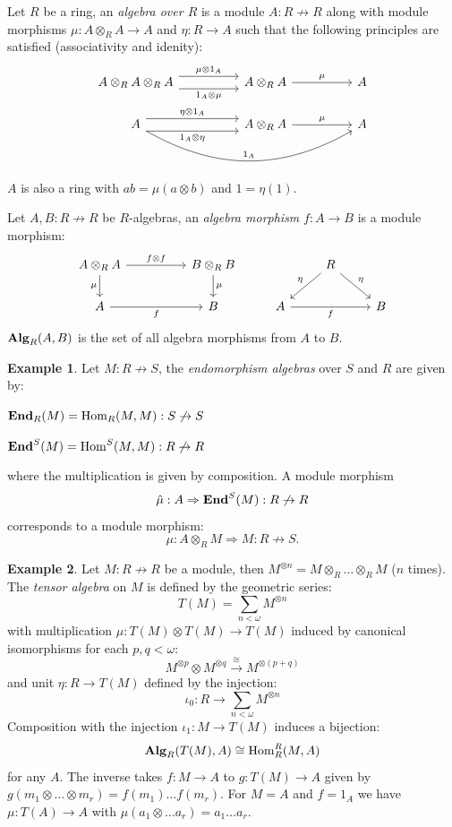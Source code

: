 \documentclass[8pt]{article}
\theoremstyle{definition}
\theoremstyle{definition}
\theoremstyle{definition}
\theoremstyle{definition}
\theoremstyle{definition}
\theoremstyle{definition}
\theoremstyle{definition}
\theoremstyle{definition}
\theoremstyle{definition}
\theoremstyle{definition}
\theoremstyle{definition}
\theoremstyle{definition}
\newtheorem{example}{Example}[section]
\theoremstyle{definition}
\theoremstyle{definition}
\theoremstyle{question}
\begin{document}
Let $R$ be a ring, an \emph{algebra over $R$} is a module $A : R \not\to R$
along with module morphisms $\mu : A \otimes_R A \to A$ and $\eta : R \to A$ such that 
the following principles are satisfied (associativity and idenity):
\[
\begin{tikzcd}
 A \otimes_R A \otimes_R A \ar[rr, shift left=1.15ex, "\mu \otimes 1_A"] \ar[rr, shift right=1.15ex, "1_A \otimes \mu"'] && A \otimes_R A \ar[rr, "\mu"] && A \\
 A \ar[rr, shift left=1.15ex, "\eta \otimes 1_A"] \ar[rrrr, bend right=30, "1_A"] \ar[rr, shift right=1.15ex, "1_A \otimes \eta"'] && A \otimes_R A \ar[rr, "\mu"] && A 
\end{tikzcd}
\]
$A$ is also a ring with $a b = \mu(a \otimes b)$ and $1 = \eta(1)$.

Let $A, B : R \not\to R$ be $R$-algebras, an \emph{algebra morphism}
$f : A \to B$ is a module morphism:
\[
\begin{tikzcd}
  A \otimes_R A \ar[rr, "f \otimes f"] \ar[d, "\mu"']  && B \otimes_R B \ar[d, "\mu"] && R \ar[dr, "\eta"] \ar[dl, "\eta"'] \\
  A \ar[rr, "f"'] && B                                                               & A \ar[rr, "f"'] && B       
\end{tikzcd}
\]
${\bf Alg}_R(A, B)$ is the set of all algebra morphisms from $A$ to $B$.

\begin{example}
  Let $M : R \not\to S$, the \emph{endomorphism algebras} over $S$ and $R$
  are given by:
  \begin{center}
    ${\bf End}_R(M) = \operatorname{Hom}_R(M, M) : S \not\to S$

    ${\bf End}^S(M) = \operatorname{Hom}^S(M, M) : R \not\to R$
  \end{center}
  where the multiplication is given by composition. A module morphism
  \[
  \hat{\mu} : A \Rightarrow {\bf End}^S(M) : R \not\to R
  \]
  corresponds to a module morphism:
  \[
    \mu : A \otimes_R M \Rightarrow M : R \not\to S.
  \]
\end{example}

\begin{example}
  Let $M : R \not\to R$ be a module, then $M^{\otimes n} = M \otimes_R \ldots \otimes_R M$ ($n$ times).
  The \emph{tensor algebra} on $M$ is defined by the geometric series:
  \[
  T(M) = \sum \limits_{n < \omega} M^{\otimes n}
  \]
  with multiplication $\mu : T(M) \otimes T(M) \to T(M)$ induced by canonical isomorphisms
  for each $p, q < \omega$:
  \[
  M^{\otimes p} \otimes M^{\otimes q} \xrightarrow{\cong} M^{\otimes (p + q)}
  \]
  and unit $\eta : R \to T(M)$ defined by the injection:
  \[
  \iota_0 : R \to \sum \limits_{n < \omega} M^{\otimes n}
  \]
  Composition with the injection $\iota_1 : M \to T(M)$ induces a bijection:
  \[
  {\bf Alg}_R(T(M), A) \cong \operatorname{Hom}^R_R(M, A)
  \]
  for any $A$. The inverse takes $f : M \to A$ to $g : T(M) \to A$
  given by $g(m_1 \otimes \ldots \otimes m_r) = f(m_1) \ldots f(m_r)$.
  For $M = A$ and $f = 1_A$ we have $\mu : T(A) \to A$
  with $\mu(a_1 \otimes \ldots a_r) = a_1 \ldots a_r$.
\end{example}
\end{document}
